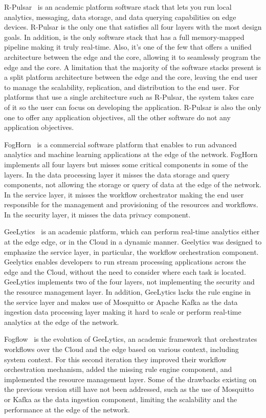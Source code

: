 R-Pulsar~\cite{8014357,8109157} is an academic platform software stack that lets you run local analytics, messaging, data storage, and data querying capabilities on edge devices. R-Pulsar is the only one that satisfies all four layers with the most design goals. In addition, is the only software stack that has a full memory-mapped pipeline making it truly real-time. Also, it's one of the few that offers a unified architecture between the edge and the core, allowing it to seamlessly program the edge and the core. A limitation that the majority of the software stacks present is a split platform architecture between the edge and the core, leaving the end user to manage the scalability, replication, and distribution to the end user. For platforms that use a single architecture such as R-Pulsar, the system takes care of it so the user can focus on developing the application. R-Pulsar is also the only one to offer any application objectives, all the other software do not any application objectives.

FogHorn~\cite{fogHorn} is a commercial software platform that enables to run advanced analytics and machine learning applications at the edge of the network. FogHorn implements all four layers but misses some critical components in some of the layers. In the data processing layer it misses the data storage and query components, not allowing the storage or query of data at the edge of the network. In the service layer, it misses the workflow orchestrator making the end user responsible for the management and provisioning of the resources and workflows. In the security layer, it misses the data privacy component.

GeeLytics~\cite{7389116} is an academic platform, which can perform real-time analytics either at the edge edge, or in the Cloud in a dynamic manner. Geelytics was designed to emphasize the service layer, in particular, the workflow orchestration component. Geelytics enables developers to run stream processing applications across the edge and the Cloud, without the need to consider where each task is located. GeeLytics implements two of the four layers, not implementing the security and the resource management layer. In addition, GeeLytics lacks the rule engine in the service layer and makes use of Mosquitto or Apache Kafka as the data ingestion data processing layer making it hard to scale or perform real-time analytics at the edge of the network.

Fogflow~\cite{8022859} is the evolution of GeeLytics, an academic framework that orchestrates workflows over the Cloud and the edge based on various context, including system context. For this second iteration they improved their workflow orchestration mechanism, added the missing rule engine component, and implemented the resource management layer. Some of the drawbacks existing on the previous version still have not been addressed, such as the use of Mosquitto or Kafka as the data ingestion component, limiting the scalability and the performance at the edge of the network.

